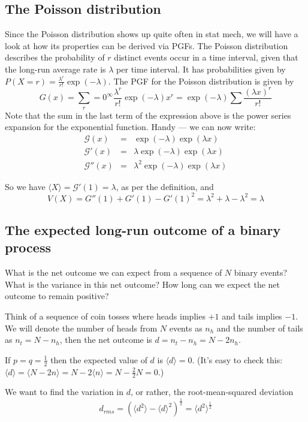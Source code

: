 \documentclass{article}
\newcommand{\calG}{\mathcal{G}}
\begin{document}
\subsection*{The Poisson distribution}
Since the Poisson distribution shows up quite often in stat mech, we will have a look at how its properties can be derived via PGFs.
The Poisson distribution describes the probability of $r$ distinct events occur in a time interval, given that the long-run average rate is $\lambda$ per time interval. It has probabilities given by $P(X=r) = \frac{\lambda^r}{r!}\exp(-\lambda)$. The PGF for the Poisson distribution is given by
$$G(x) = \sum_r=0^\infty \frac{\lambda^r}{r!}\exp(-\lambda)x^r = \exp(-\lambda)\sum\frac{(\lambda x)^r}{r!}$$
Note that the sum in the last term of the expression above is the power series expansion for the exponential function. Handy --- we can now write:
\begin{eqnarray*}
\calG(x) &=& \exp(-\lambda)\exp(\lambda x)\\
\calG'(x) &=& \lambda\exp(-\lambda)\exp(\lambda x)\\
\calG''(x)&=&\lambda^2\exp(-\lambda)\exp(\lambda x)
\end{eqnarray*}

So we have $\langle X \rangle = \calG'(1) = \lambda$, as per the definition, and
$$V(X) = G''(1) + G'(1) - G'(1)^2 = \lambda^2+\lambda-\lambda^2 = \lambda$$

\subsection*{The expected long-run outcome of a binary process}
What is the net outcome we can expect from a sequence of $N$ binary events? What is the variance in this net outcome? How long can we expect the net outcome to remain positive? 

Think of a sequence of coin tosses where heads implies $+1$ and tails implies $-1$. We will denote the number of heads from $N$ events as $n_h$ and the number of tails as $n_t = N-n_h$, then the net outcome is $d = n_t-n_h = N-2n_h$. 

If $p=q=\frac12$ then the expected value of $d$ is $\langle d\rangle= 0$. (It's easy to check this: $\langle d\rangle = \langle N-2n\rangle = N-2\langle n\rangle = N-\frac{2}{2}N=0.$)

We want to find the variation in $d$, or rather, the root-mean-squared deviation 
$$d_{rms} = \left(\langle d^2\rangle - \langle d\rangle^2\right)^{\frac12} =  \langle d^2\rangle^{\frac12}$$
\end{document}
